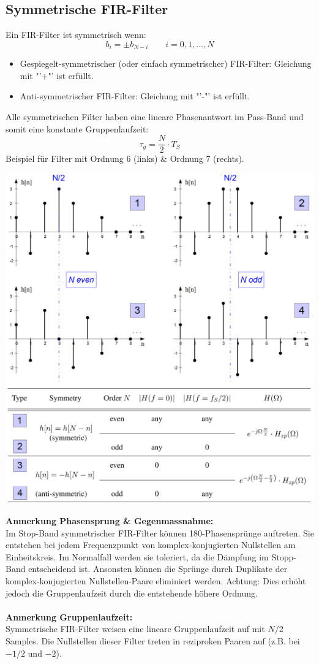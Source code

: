 \subsection{Symmetrische FIR-Filter}
Ein FIR-Filter ist symmetrisch wenn:
\[ b_i = \pm b_{N-i} \qquad i = 0,1,\ldots,N \]
\begin{itemize}[noitemsep,topsep=3pt]
	\item Gespiegelt-symmetrischer (oder einfach symmetrischer) FIR-Filter: Gleichung mit "'+"' ist erfüllt.
	\item Anti-symmetrischer FIR-Filter: Gleichung mit "'-"' ist erfüllt.
\end{itemize}\vspace{5pt}
Alle symmetrischen Filter haben eine lineare Phasenantwort im Pass-Band und somit 
eine konstante Gruppenlaufzeit:
\[ \tau_g = \frac{N}{2} \cdot T_S \]
Beispiel für Filter mit Ordnung 6 (links) \& Ordnung 7 (rechts).
\begin{center}
	\includegraphics[width=.7\textwidth]{../fig/fir_filter}
	\includegraphics[width=.75\textwidth]{../fig/fir_table}
\end{center}
\textbf{Anmerkung Phasensprung \& Gegenmassnahme:\\}
Im Stop-Band symmetrischer FIR-Filter können 180\textdegree -Phasensprünge auftreten.
Sie entstehen bei jedem Frequenzpunkt von komplex-konjugierten Nullstellen am Einheitskreis.
Im Normalfall werden sie toleriert, da die Dämpfung im Stopp-Band entscheidend ist. 
Ansonsten können die Sprünge durch Duplikate der komplex-konjugierten Nullstellen-Paare 
eliminiert werden. Achtung: Dies erhöht jedoch die Gruppenlaufzeit durch die entstehende
höhere Ordnung.\\\\
\textbf{Anmerkung Gruppenlaufzeit:\\} 
Symmetrische FIR-Filter weisen eine lineare Gruppenlaufzeit auf mit $N/2$ Samples.
Die Nullstellen dieser Filter treten in reziproken Paaren auf (z.B. bei $-1/2$ und $-2$).
